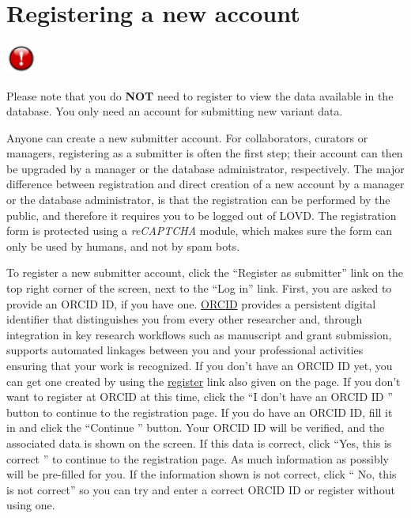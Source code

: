 \documentclass[a4paper,oneside,openany,12pt]{memoir}
\newlength{\infoboxlength}
\newlength{\infoboxinnerlength}
\newenvironment{warntable}
  {\begin{lrbox}{\infobox}%
    \begin{minipage}[t]{1.5cm}
      \centering
      \vspace{0pt}
      \includegraphics[width=1cm,height=1cm]{lovd_warning.png}
    \end{minipage}
   \begin{minipage}[t]{\infoboxlength}\vspace{5pt}\begin{minipage}{\infoboxinnerlength}}
  {\vspace{6pt}\end{minipage}\end{minipage}\end{lrbox}%
   \begin{center}
   \fcolorbox{black}{LOVDlight}{\usebox{\infobox}}
   \end{center}}
\renewenvironment{leftbar}[1][\hsize]
{%
    \def\FrameCommand
    {%
        {\color{LOVDdark}\vrule width 3pt \hspace{5pt}}%
        \colorbox{LOVDlight}%
    }%
    \MakeFramed{\hsize#1\advance\hsize-\width\FrameRestore}%
}
{\endMakeFramed}
\begin{document}
\section{Registering a new account}
\begin{warntable}
Please note that you do \textbf{NOT} need to register to view the data available in the database.
You only need an account for submitting new variant data.
\end{warntable}
Anyone can create a new submitter account.
For collaborators, curators or managers, registering as a submitter is often the first step;
 their account can then be upgraded by a manager or the database administrator, respectively.
The major difference between registration and direct creation of a new account by a manager or the database administrator,
 is that the registration can be performed by the public, and therefore it requires you to be logged out of LOVD.
The registration form is protected using a \emph{reCAPTCHA} module, which makes sure the form can only be used by humans, and not by spam bots.
\\
\par
To register a new submitter account, click the ``Register as submitter'' link on the top right corner of the screen, next to the ``Log in'' link.
First, you are asked to provide an ORCID ID, if you have one.
\href{http://about.orcid.org/}{ORCID} provides a persistent digital identifier that distinguishes you from every other researcher and,
 through integration in key research workflows such as manuscript and grant submission,
 supports automated linkages between you and your professional activities ensuring that your work is recognized.
If you don't have an ORCID ID yet, you can get one created by using the \href{https://orcid.org/register}{register} link also given on the page.
If you don't want to register at ORCID at this time, click the ``I don't have an ORCID ID \guillemotright'' button to continue to the registration page.
If you do have an ORCID ID, fill it in and click the ``Continue \guillemotright'' button.
Your ORCID ID will be verified, and the associated data is shown on the screen.
If this data is correct, click ``Yes, this is correct \guillemotright'' to continue to the registration page.
As much information as possibly will be pre-filled for you.
If the information shown is not correct, click ``\guillemotleft{} No, this is not correct''
 so you can try and enter a correct ORCID ID or register without using one.
\end{document}
